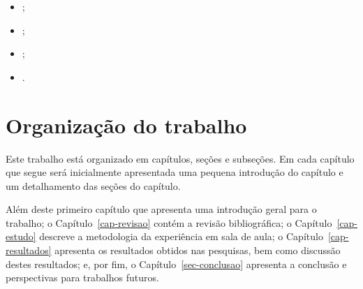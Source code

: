 \begin{itemize}
\item{;}
\item{;}
\item{;}
\item{.}
\end{itemize}

\section{Organização do trabalho}
Este trabalho está organizado em capítulos, seções e subseções.
Em cada capítulo que segue será inicialmente
apresentada uma pequena introdução do capítulo e um detalhamento
das seções do capítulo.

Além deste primeiro capítulo que apresenta uma introdução geral
para o trabalho;
o Capítulo~\ref{cap-revisao} contém a revisão bibliográfica;
o Capítulo~\ref{cap-estudo} descreve a metodologia da experiência em sala de aula;
o Capítulo~\ref{cap-resultados} apresenta os resultados obtidos nas pesquisas, bem
como discussão destes resultados;
e, por fim, o Capítulo~\ref{sec-conclusao} apresenta a conclusão e perspectivas
para trabalhos futuros.
